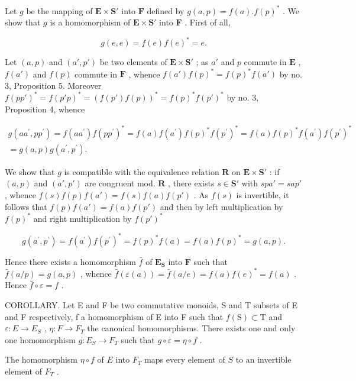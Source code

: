 Let \(g\) be the mapping of \(\mathbf{E} \times \mathbf{S}'\) into \(\mathbf{F}\) defined by \(g(a, p) = f(a).f(p)^*\) . We show that \(g\) is a homomorphism of \(\mathbf{E} \times \mathbf{S}'\) into \(\mathbf{F}\) . First of all,

\[
g (e, e) = f (e) f (e) ^ {*} = e.
\]

Let \((a, p)\) and \((a', p')\) be two elements of \(\mathbf{E} \times \mathbf{S}'\) ; as \(a'\) and \(p\) commute in \(\mathbf{E}\) , \(f(a')\) and \(f(p)\) commute in \(\mathbf{F}\) , whence \(f(a')f(p)^* = f(p)^*f(a')\) by no. 3, Proposition 5. Moreover \(f(p p')^* = f(p' p)^* = (f(p')f(p))^* = f(p)^*f(p')^*\) by no. 3, Proposition 4, whence

\[
\begin{array}{l} g (a a ^ {\prime}, p p ^ {\prime}) = f (a a ^ {\prime}) f (p p ^ {\prime}) ^ {*} = f (a) f (a ^ {\prime}) f (p) ^ {*} f (p ^ {\prime}) ^ {*} = f (a) f (p) ^ {*} f (a ^ {\prime}) f (p ^ {\prime}) ^ {*} \\ = g (a, p) g (a ^ {\prime}, p ^ {\prime}). \end{array}
\]

We show that \(g\) is compatible with the equivalence relation \(\mathbf{R}\) on \(\mathbf{E} \times \mathbf{S}'\) : if \((a, p)\) and \((a', p')\) are congruent mod. \(\mathbf{R}\) , there exists \(s \in \mathbf{S}'\) with \(spa' = sap'\) , whence \(f(s)f(p)f(a') = f(s)f(a)f(p')\) . As \(f(s)\) is invertible, it follows that \(f(p)f(a') = f(a)f(p')\) and then by left multiplication by \(f(p)^*\) and right multiplication by \(f(p')^*\)

\[
g (a ^ {\prime}, p ^ {\prime}) = f (a ^ {\prime}) f (p ^ {\prime}) ^ {*} = f (p) ^ {*} f (a) = f (a) f (p) ^ {*} = g (a, p).
\]

Hence there exists a homomorphism \(\bar{f}\) of \(\mathbf{E}_{\mathbf{S}}\) into \(\mathbf{F}\) such that \(\bar{f}(a/p) = g(a,p)\) , whence \(\bar{f}(\varepsilon(a)) = \bar{f}(a/e) = f(a)f(e)^* = f(a)\) . Hence \(\bar{f} \circ \varepsilon = f\) .

COROLLARY. Let E and F be two commutative monoids, S and T subsets of E and F respectively, f a homomorphism of E into F such that \(f(\mathrm{S}) \subset \mathrm{T}\) and \(\varepsilon: E \to E_{S}\) , \(\eta: F \to F_{T}\) the canonical homomorphisms. There exists one and only one homomorphism \(g: E_{S} \to F_{T}\) such that \(g \circ \varepsilon = \eta \circ f\) .

The homomorphism \(\eta \circ f\) of \(E\) into \(F_{T}\) maps every element of \(S\) to an invertible element of \(F_{T}\) .

